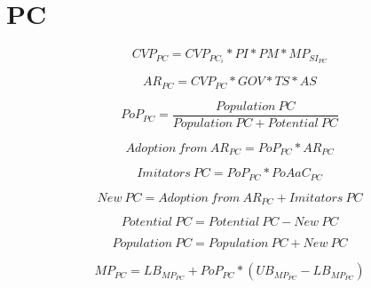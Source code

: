 \newpage
\section{PC}

\begin{equation}
		CVP_ {PC} =  CVP_{PC_{i}} * PI * PM * MP_{SI_{PC}}
\end{equation}

\begin{equation}
		AR_{PC} = CVP_{PC} * GOV * TS * AS		
\end{equation}

\begin{equation}
	PoP_{PC} = \frac{\mathit{Population~PC}}{\mathit{Population~PC}+\mathit{Potential~PC}}
\end{equation}

\begin{equation}
	\mathit{Adoption~from~AR_{PC}} = PoP_{PC} * AR_{PC}
\end{equation}

\begin{equation}
	\mathit{Imitators~PC} = PoP_{PC} * PoAaC_{PC}
\end{equation}

\begin{equation}
	\mathit{New~PC} = \mathit{Adoption~from~AR_{PC}} + \mathit{Imitators~PC}
\end{equation}

\begin{equation}
	\mathit{Potential~PC} = \mathit{Potential~PC} - \mathit{New~PC}
\end{equation}

\begin{equation}
	\mathit{Population~PC} = \mathit{Population~PC} + \mathit{New~PC}
\end{equation}

\begin{equation}
	MP_{PC} = LB_{MP_{PC}} + PoP_{PC} * (UB_{MP_{PC}} - LB_{MP_{PC}})
\end{equation}
